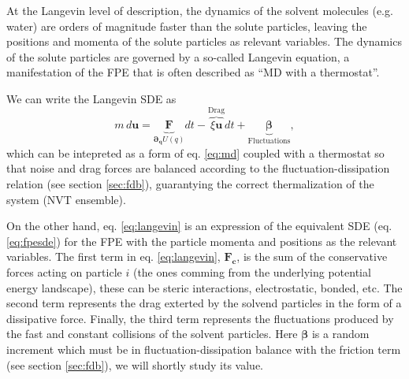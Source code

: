 \documentclass[ twoside,openright,titlepage,numbers=noenddot,%
headinclude,footinclude,cleardoublepage=empty,abstract=on,
BCOR=5mm,paper=a4,fontsize=11pt, dvipsnames
]{scrreprt}
\renewcommand{\vec}[1]{\bm{#1}}
\newcommand{\ppos}{q}
\newcommand{\pvel}{u}
\begin{document}
At the Langevin level of description, the dynamics of the solvent molecules (e.g. water) are orders of magnitude faster than the solute particles, leaving the positions and momenta of the solute particles as relevant variables. The dynamics of the solute particles are governed by a so-called Langevin equation, a manifestation of the \gls{FPE} that is often described as ``\gls{MD} with a thermostat''.

We can write the Langevin \gls{SDE} as
\begin{equation}
  \label{eq:langevin}
  m\, d\vec{\pvel} = \underbrace{\vec{F}}_{\vec{\partial}_{\vec{\ppos}}U(\ppos)}dt - \overbrace{\xi\vec{\pvel}}^{\text{Drag}}dt + \underbrace{\vec{\beta}}_{\text{Fluctuations}},
\end{equation}
which can be intepreted as a form of eq. \eqref{eq:md} coupled with a thermostat so that noise and drag forces are balanced according to the fluctuation-dissipation relation (see section \ref{sec:fdb}), guarantying the correct thermalization of the system (NVT ensemble).

On the other hand, eq. \eqref{eq:langevin} is an expression of the equivalent \gls{SDE} (eq. \eqref{eq:fpesde}) for the \gls{FPE} with the particle momenta and positions as the relevant variables. The first term in eq. \eqref{eq:langevin}, $\vec{F_c}$, is the sum of the conservative forces acting on particle $i$ (the ones comming from the underlying potential energy landscape), these can be steric interactions, electrostatic, bonded, etc.
The second term represents the drag exterted by the solvend particles in the form of a dissipative force.
Finally, the third term represents the fluctuations produced by the fast and constant collisions of the solvent particles. Here $\vec{\beta}$ is a random increment which must be in fluctuation-dissipation balance with the friction term (see section \ref{sec:fdb}), we will shortly study its value.
\end{document}
